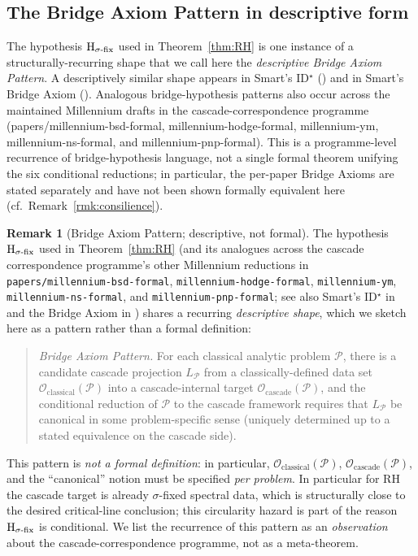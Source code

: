 \documentclass[11pt, a4paper]{amsart}
\theoremstyle{definition}
\newtheorem{remark}[theorem]{Remark}
\begin{document}
\subsection{The Bridge Axiom Pattern in descriptive
form}\label{subsec:bridge_canonical}

The hypothesis $\textup{H}_{\sigma\text{-fix}}$ used in
Theorem~\ref{thm:RH} is one instance of a structurally-recurring
shape that we call here the \emph{descriptive Bridge Axiom Pattern}.
A descriptively similar shape appears in Smart's ID$^\star$
(\cite[ID$^\star$ postulate]{SmartPaperII}) and in Smart's Bridge Axiom
(\cite[Bridge Axiom, paperC\_rh\_translation.tex
lines 278--304]{SmartPaperC}).  Analogous bridge-hypothesis patterns
also occur across the maintained Millennium drafts in the
cascade-correspondence programme
(papers/millennium-bsd-formal, millennium-hodge-formal,
millennium-ym, millennium-ns-formal, and
millennium-pnp-formal).  This is a programme-level recurrence
of bridge-hypothesis language, not a single formal theorem
unifying the six conditional reductions; in particular, the
per-paper Bridge Axioms are stated separately and have not been
shown formally equivalent here (cf.\
Remark~\ref{rmk:consilience}).

\begin{remark}[Bridge Axiom Pattern; descriptive, not formal]\label{rmk:bridge_canonical}
The hypothesis $\textup{H}_{\sigma\text{-fix}}$ used in
Theorem~\ref{thm:RH} (and its analogues across the cascade
correspondence programme's other Millennium reductions in
\texttt{papers/millennium-bsd-formal}, \texttt{millennium-hodge-formal},
\texttt{millennium-ym}, \texttt{millennium-ns-formal}, and
\texttt{millennium-pnp-formal}; see also Smart's
ID$^\star$ in \cite{SmartPaperII} and the Bridge Axiom in
\cite{SmartPaperC}) shares a recurring \emph{descriptive shape},
which we sketch here as a pattern rather than a formal definition:

\begin{quote}
\emph{Bridge Axiom Pattern.}  For each classical analytic problem
$\mathcal{P}$, there is a candidate cascade projection
$L_{\mathcal{P}}$ from a classically-defined data set
$\mathcal{O}_{\mathrm{classical}}(\mathcal{P})$ into a
cascade-internal target $\mathcal{O}_{\mathrm{cascade}}(\mathcal{P})$,
and the conditional reduction of $\mathcal{P}$ to the cascade
framework requires that $L_{\mathcal{P}}$ be canonical in some
problem-specific sense (uniquely determined up to a stated
equivalence on the cascade side).
\end{quote}

This pattern is \emph{not a formal definition}: in particular,
$\mathcal{O}_{\mathrm{classical}}(\mathcal{P})$,
$\mathcal{O}_{\mathrm{cascade}}(\mathcal{P})$, and the
``canonical'' notion must be specified \emph{per problem}.  In
particular for RH the cascade target is already $\sigma$-fixed
spectral data, which is structurally close to the desired
critical-line conclusion; this circularity hazard is part of the
reason $\textup{H}_{\sigma\text{-fix}}$ is conditional.  We list
the recurrence of this pattern as an \emph{observation} about the
cascade-correspondence programme, not as a meta-theorem.
\end{remark}
\end{document}
